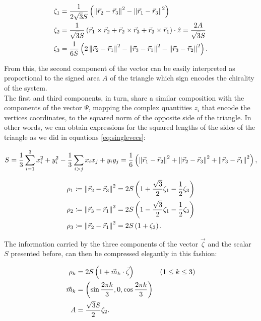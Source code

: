 \begin{align*}
\zeta_1 &= \frac{1}{2\sqrt{3}S}\left( \left\lVert \vec{r}_2 -\vec{r}_3 \right\rVert^2-\left\lVert \vec{r}_1 -\vec{r}_3 \right\rVert^2 \right)\\
\zeta_2 &= \frac{1}{\sqrt{3}S}\left( \vec{r}_1\times\vec{r}_2 + \vec{r}_2\times\vec{r}_3 +\vec{r}_3\times\vec{r}_1 \right)\cdot\hat{z} = \frac{2A}{\sqrt{3}S} \\
\zeta_3 &= \frac{1}{6S}\left( 2\left\lVert \vec{r}_2 -\vec{r}_1 \right\rVert^2-\left\lVert \vec{r}_3 -\vec{r}_1 \right\rVert^2-\left\lVert \vec{r}_3 -\vec{r}_2 \right\rVert^2 \right).
\end{align*}

From this, the second component of the vector can be easily interpreted as proportional to the signed area $A$ of the triangle which sign encodes the chirality of the system.\\

The first and third components, in turn, share a similar composition with the components of the vector $\Psi$, mapping the complex quantities $z_i$ that encode the vertices coordinates, to the squared norm of the opposite side of the triangle. In other words, we can obtain expressions for the squared lengths of the sides of the triangle as we did in equations \eqref{eq:singlevecs}:

\begin{align*}
S &= \frac{1}{3}\sum_{i=1}^3 x_i^2 + y_i^2 -\frac{1}{3}\sum_{i > j} x_ix_j + y_iy_j  = \frac{1}{6}\left( \left\lVert \vec{r}_1 -\vec{r}_2 \right\rVert^2+\left\lVert \vec{r}_2 -\vec{r}_3 \right\rVert^2+\left\lVert \vec{r}_3 -\vec{r}_1 \right\rVert^2 \right),\\
\end{align*}

\begin{equation}
\begin{aligned}
\rho_1 &\coloneqq \left\lVert \vec{r}_2 -\vec{r}_3 \right\rVert^2 = 2S\left( 1+\frac{\sqrt{3}}{2}\zeta_1-\frac{1}{2}\zeta_3 \right) \\
\rho_2 &\coloneqq \left\lVert \vec{r}_3 -\vec{r}_1 \right\rVert^2 = 2S\left( 1-\frac{\sqrt{3}}{2}\zeta_1-\frac{1}{2}\zeta_3 \right) \\
\rho_3 &\coloneqq \left\lVert \vec{r}_2 -\vec{r}_1 \right\rVert^2 = 2S\left( 1+\zeta_3 \right).
\end{aligned}
\label{eq:lados}
\end{equation}

The information carried by the three components of the vector $\vec{\zeta}$ and the scalar $S$ presented before, can then be compressed elegantly in this fashion:

\begin{equation}
\begin{aligned}
\rho_k &= 2S\left( 1+\vec{m}_k\cdot\vec{\zeta} \right) & (1 \leq k \leq 3)\\
\vec{m}_k &= \left( \sin{\frac{2\pi k}{3}},0,\cos{\frac{2\pi k}{3}} \right)\\
A &= \frac{\sqrt{3}S}{2} \zeta_2.
\end{aligned}
\label{eq:compressed}
\end{equation}

